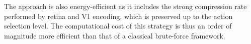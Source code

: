 The approach is also energy-efficient as it includes the strong compression rate performed by retina and V1 encoding, which is preserved up to the action selection level. The computational cost of this strategy is thus an order of magnitude more efficient than that of a classical brute-force framework.
%
%
%

